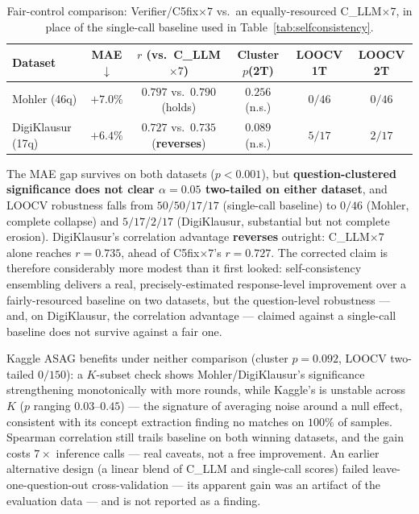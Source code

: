 \documentclass[conference]{IEEEtran}
\begin{document}
\begin{table}[t]
\caption{Fair-control comparison: Verifier/C5fix$\times7$ vs.\ an
equally-resourced C\_LLM$\times7$, in place of the single-call baseline
used in Table~\ref{tab:selfconsistency}.}
\label{tab:faircontrol}
\centering
\footnotesize
\setlength{\tabcolsep}{3pt}
\begin{tabular}{lccccc}
\toprule
\textbf{Dataset} & MAE$\downarrow$ & $r$ (vs.\ C\_LLM$\times7$) & Cluster $p$(2T) & LOOCV 1T & LOOCV 2T \\
\midrule
Mohler (46q)      & $+7.0\%$ & $0.797$ vs.\ $0.790$ (holds) & $0.256$ (n.s.) & $0/46$ & $0/46$ \\
DigiKlausur (17q) & $+6.4\%$ & $0.727$ vs.\ $0.735$ (\textbf{reverses}) & $0.089$ (n.s.) & $5/17$ & $2/17$ \\
\bottomrule
\end{tabular}
\end{table}

The MAE gap survives on both datasets ($p<0.001$), but
\textbf{question-clustered significance does not clear $\alpha=0.05$
two-tailed on either dataset}, and LOOCV robustness falls from
$50/50$/$17/17$ (single-call baseline) to $0/46$ (Mohler, complete
collapse) and $5/17$/$2/17$ (DigiKlausur, substantial but not complete
erosion). DigiKlausur's correlation advantage \textbf{reverses}
outright: C\_LLM$\times7$ alone reaches $r=0.735$, ahead of
C5fix$\times7$'s $r=0.727$. The corrected claim is therefore
considerably more modest than it first looked: self-consistency
ensembling delivers a real, precisely-estimated response-level
improvement over a fairly-resourced baseline on two datasets, but the
question-level robustness — and, on DigiKlausur, the correlation
advantage — claimed against a single-call baseline does not survive
against a fair one.

Kaggle ASAG benefits under neither comparison (cluster $p=0.092$, LOOCV
two-tailed $0/150$): a $K$-subset check shows Mohler/DigiKlausur's
significance strengthening monotonically with more rounds, while
Kaggle's is unstable across $K$ ($p$ ranging $0.03$--$0.45$) — the
signature of averaging noise around a null effect, consistent with its
concept extraction finding no matches on $100\%$ of samples. Spearman
correlation still trails baseline on both winning datasets, and the
gain costs $7\times$ inference calls — real caveats, not a free
improvement. An earlier alternative design (a linear blend of C\_LLM
and single-call scores) failed leave-one-question-out cross-validation
--- its apparent gain was an artifact of the evaluation data --- and is
not reported as a finding.
\end{document}
